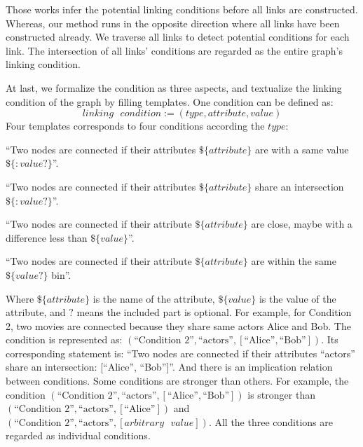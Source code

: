 Those works infer the potential linking conditions before all links are constructed. 
Whereas, our method runs in the opposite direction where all links have been constructed already.
We traverse all links to detect potential conditions for each link.
The intersection of all links' conditions are regarded as the entire graph's linking condition.

At last, we formalize the condition as three aspects, and textualize the linking condition of the graph by filling templates. 
One condition can be defined as:
\begin{equation}
    linking\text{ }condition := ( type, attribute, value )
\end{equation}
Four templates corresponds to four conditions according the $type$:

\begin{compactenum}
    \item ``Two nodes are connected if their attributes $ \$\{ attribute \} $ are with a same value$\$\{: value ?\}$''.
    \item ``Two nodes are connected if their attributes $ \$\{ attribute \} $ share an intersection$\$\{: value ?\}$''.
    \item ``Two nodes are connected if their attribute $ \$\{ attribute \} $ are close, maybe with a difference less than $\$\{ value \}$''.
    \item ``Two nodes are connected if their attribute $ \$\{ attribute \} $ are within the same $\$\{ value ?\}$ bin''.
\end{compactenum}

Where $ \$\{ attribute \} $ is the name of the attribute, $ \$\{ value \} $ is the value of the attribute, and $?$ means the included part is optional. 
For example, for Condition 2, two movies are connected because they share same actors Alice and Bob. 
The condition is represented as: $(\text{``Condition 2''}, \text{``actors''}, [\text{``Alice''}, \text{``Bob''}])$. 
Its corresponding statement is: ``Two nodes are connected if their attributes ``actors'' share an intersection: [``Alice'', ``Bob'']''. 
And there is an implication relation between conditions.
Some conditions are stronger than others.
For example, the condition $(\text{``Condition 2''}, \text{``actors''}, [\text{``Alice''}, \text{``Bob''}])$ is stronger than $(\text{``Condition 2''}, \text{``actors''}, [\text{``Alice''}])$ and $(\text{``Condition 2''}, \text{``actors''}, [arbitrary\text{ }value])$.
All the three conditions are regarded as individual conditions.

